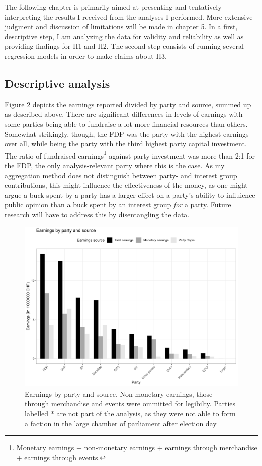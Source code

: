 \documentclass[11pt,a4paper]{article}
\begin{document}
The following chapter is primarily aimed at presenting and tentatively interpreting the results I received from the analyses I performed. More extensive judgment and discussion of limitations will be made in chapter 5. In a first, descriptive step, I am analyzing the data for validity and reliability as well as providing findings for H1 and H2. The second step consists of running several regression models in order to make claims about H3.

\subsection{Descriptive analysis}
Figure 2 depicts the earnings reported divided by party and source, summed up as described above. There are significant differences in levels of earnings with some parties being able to fundraise a lot more financial resources than others. Somewhat strikingly, though, the FDP was the party with the highest earnings over all, while being the party with the third highest party capital investment. The ratio of fundraised earnings\footnote{Monetary earnings + non-monetary earnings + earnings through merchandise + earnings through events.} against party investment was more than 2:1 for the FDP, the only analysis-relevant party where this is the case. As my aggregation method does not distinguish between party- and interest group contributions, this might influence the effectiveness of the money, as one might argue a buck spent by a party has a larger effect on a party’s ability to influience public opinion than a buck spent by an interest group \textit{for} a party. Future research will have to address this by disentangling the data.

\begin{figure}
    \centering
    \includegraphics[width=1\linewidth]{output/plots/plot_figure_2.png}
    \caption{Earnings by party and source. Non-monetary earnings, those through merchandise and events were ommitted for legibilty. Parties labelled * are not part of the analysis, as they were not able to form a faction in the large chamber of parliament after election day}
    \label{fig:enter-label}
\end{figure}
\end{document}
